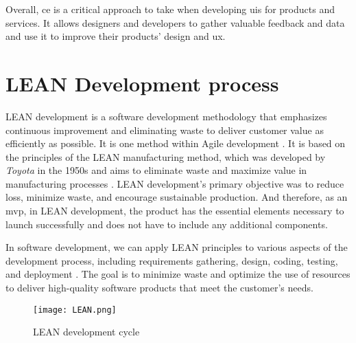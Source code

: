 Overall, \ac{ce} is a critical approach to take when developing \ac{ui}s for products and services. 
It allows designers and developers to gather valuable feedback and data and use it to improve their products' design and \ac{ux}.
\clearpage

\section{LEAN Development process}
\label{background:section:lean}
LEAN development is a software development methodology that emphasizes continuous improvement and eliminating waste to deliver customer value as efficiently as possible. 
It is one method within Agile development \cite{misc:lean:tutorial}.
It is based on the principles of the LEAN manufacturing method, which was developed by \textit{Toyota} in the 1950s and aims to eliminate waste and maximize value in manufacturing processes \cite{misc:lean:toyota}.
LEAN development's primary objective was to reduce loss, minimize waste, and encourage sustainable production.
And therefore, as an \ac{mvp}, in LEAN development, the product has the essential elements necessary to launch successfully and does not have to include any additional components.

In software development, we can apply LEAN principles to various aspects of the development process, including requirements gathering, design, coding, testing, and deployment \cite{misc:lean:tutorial}.
The goal is to minimize waste and optimize the use of resources to deliver high-quality software products that meet the customer's needs.
\begin{figure}[htbp!]
  \centering    
  \texttt{[image: LEAN.png]}
  \caption[LEAN development cycle]{LEAN development cycle\footnotemark[6]}
  \label{fig:background:lean}
\end{figure}

